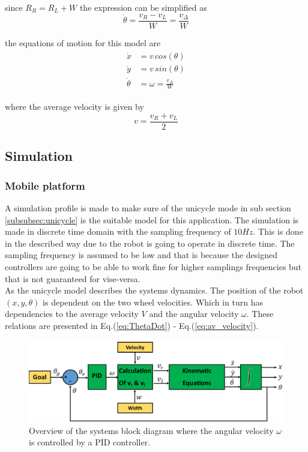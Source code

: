 since $R_R = R_L + W$ the expression can be simplified as
\begin{equation}
\dot{\theta}= \frac{v_R - v_L}{W} = \frac{v_\Delta}{W}\label{eq:ThetaDot}
\end{equation}

the equations of motion for this model are
\begin{eqnarray}
\begin{aligned}
\dot{x} &= v\,cos(\theta)\\
\dot{y} &= v\,sin(\theta)\\
\dot{\theta} &= \omega = \frac{v_\Delta}{W}
\end{aligned}
\label{eq:MotionEq}
\end{eqnarray}

where the average velocity\parencite{Corke2011} is given by        
\begin{equation}
v = \frac{v_R + v_L}{2} 
\label{eq:av_velocity}
\end{equation}

\subsection{Simulation}
\subsubsection{Mobile platform}
A simulation profile is made to make sure of the unicycle mode in sub section \ref{subsubsec:unicycle} is the suitable model for this application.
The simulation is made in discrete time domain with the sampling frequency of $10Hz$.
This is done in the described way due to the robot is going to operate in discrete time.
The sampling frequency is assumed to be low and that is because the designed controllers are going to be able to work fine for higher samplings frequencies but that is not guaranteed for vise-versa.\\  
As the unicycle model describes the systems dynamics.
The position of the robot $(x, y, \theta)$ is dependent on the two wheel velocities. Which in turn has dependencies to the average velocity $V$ and the angular velocity $\omega$. These relations are presented in Eq.(\ref{eq:ThetaDot}) - Eq.(\ref{eq:av_velocity}).\\
\begin{figure}[ht]
\centering
\includegraphics[width=\textwidth]{sections/assets/omegaCtrlr.png}
\caption{Overview of the systems block diagram where the angular velocity $\omega$ is controlled by a PID controller.}
\label{fig:overview}
\end{figure} 

